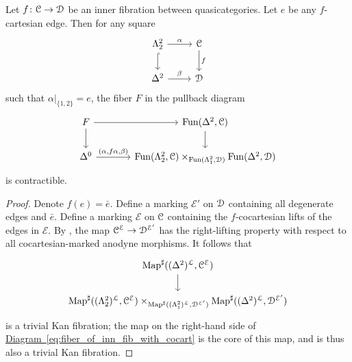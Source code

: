 \documentclass[main.tex]{subfiles}
\begin{document}
\begin{lemma}
  \label{lemma:cartesian_horn_fillings_contractible}
  Let $f\colon \mathcal{C} \to \mathcal{D}$ be an inner fibration between quasicategories. Let $e$ be any $f$-cartesian edge. Then for any square
  \begin{equation*}
    \begin{tikzcd}
      \Lambda^{2}_{2}
      \arrow[r, "\alpha"]
      \arrow[d, hook]
      & \category{C}
      \arrow[d, "f"]
      \\
      \Delta^{2}
      \arrow[r, "\beta"]
      & \category{D}
    \end{tikzcd}
  \end{equation*}
  such that $\alpha|_{\{1,2\}} = e$, the fiber $F$ in the pullback diagram
  \begin{equation}
    \label{eq:fiber_of_inn_fib_with_cocart}
    \begin{tikzcd}[column sep=large]
      F
      \arrow[r]
      \arrow[d]
      & \Fun(\Delta^{2}, \category{C})
      \arrow[d]
      \\
      \Delta^{0}
      \arrow[r, "{(\alpha, f\alpha, \beta)}"]
      & \Fun(\Lambda^{2}_{2}, \category{C}) \times_{\Fun(\Lambda^{2}_{1}, \category{D})} \Fun(\Delta^{2}, \category{D})
    \end{tikzcd}
  \end{equation}
  is contractible.
\end{lemma}
\begin{proof}
  Denote $f(e) = \bar{e}$. Define a marking $\mathcal{E}'$ on $\mathcal{D}$ containing all degenerate edges and $\bar{e}$. Define a marking $\mathcal{E}$ on $\mathcal{C}$ containing the $f$-cocartesian lifts of the edges in $\mathcal{E}$. By \cite[Prop.\ 3.1.1.6]{highertopostheory}, the map $\mathcal{C}^{\mathcal{E}} \to \mathcal{D}^{\mathcal{E}'}$ has the right-lifting property with respect to all cocartesian-marked anodyne morphisms. It follows that
  \begin{equation*}
    \begin{tikzcd}[column sep=large]
      \Map^{\sharp}((\Delta^{2})^{\mathcal{L}}, \category{C}^{\mathcal{E}})
      \arrow[d]
      \\
      \Map^{\sharp}((\Lambda^{2}_{2})^{\mathcal{L}}, \category{C}^{\mathcal{E}}) \times_{\Map^{\sharp}((\Lambda^{2}_{1})^{\mathcal{L}}, \category{D}^{\mathcal{E}'})} \Map^{\sharp}((\Delta^{2})^{\mathcal{L}}, \category{D}^{\mathcal{E}'})
    \end{tikzcd}
  \end{equation*}
  is a trivial Kan fibration; the map on the right-hand side of \hyperref[eq:fiber_of_inn_fib_with_cocart]{Diagram~\ref*{eq:fiber_of_inn_fib_with_cocart}} is the core of this map, and is thus also a trivial Kan fibration.
\end{proof}
\end{document}

